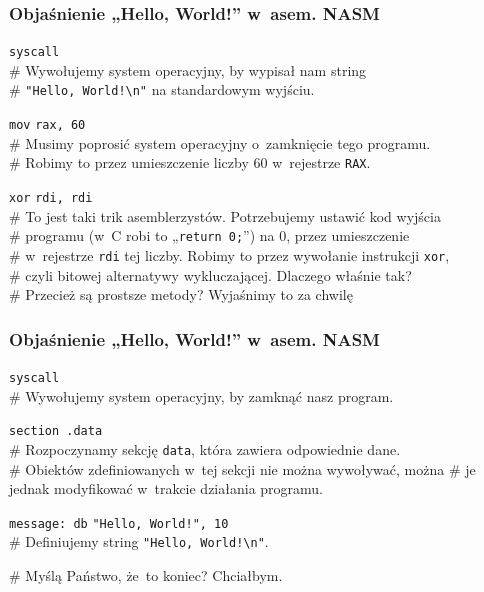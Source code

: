 \documentclass[10pt,t]{beamer}
\begin{document}
\begin{frame}
  \frametitle{Objaśnienie „Hello, World!” w~asem. NASM
    \parencite{Toal-NASM-Tutorial-Ver-2024}}


  \hphantom{aaaaaaaaa} \texttt{syscall} \\
  \# Wywołujemy system operacyjny, by wypisał nam string \\
  \# \texttt{"Hello, World!\textbackslash n"} na standardowym
  wyjściu.

  \hphantom{aaaaaaaaa} \texttt{mov} \hphantom{aaaaaa} \texttt{rax, 60} \\
  \# Musimy poprosić system operacyjny o~zamknięcie tego programu. \\
  \# Robimy to przez umieszczenie liczby $60$ w~rejestrze \texttt{RAX}.

  \hphantom{aaaaaaaaa} \texttt{xor} \hphantom{aaaaaa} \texttt{rdi, rdi} \\
  \# To jest taki trik asemblerzystów. Potrzebujemy ustawić kod wyjścia \\
  \# programu (w~C robi to „\texttt{return 0;}”) na $0$, przez
  umieszczenie \\
  \# w~rejestrze \texttt{rdi} tej liczby. Robimy to przez wywołanie
  instrukcji \texttt{xor}, \\
  \# czyli bitowej alternatywy wykluczającej. Dlaczego właśnie tak? \\
  \# Przecież są prostsze metody? Wyjaśnimy to za chwilę

\end{frame}





\begin{frame}
  \frametitle{Objaśnienie „Hello, World!” w~asem. NASM
    \parencite{Toal-NASM-Tutorial-Ver-2024}}


  \hphantom{aaaaaaaaa} \texttt{syscall} \\
  \# Wywołujemy system operacyjny, by zamknąć nasz program.

  \hphantom{aaaaaaaaa} \texttt{section .data} \\
  \# Rozpoczynamy sekcję \texttt{data}, która zawiera odpowiednie
  dane. \\
  \# Obiektów zdefiniowanych w~tej sekcji nie można wywoływać, można
  \# je jednak modyfikować w~trakcie działania programu.

  \texttt{message: db} \hphantom{aaaaa} \texttt{"Hello, World!", 10} \\
  \# Definiujemy string \texttt{"Hello, World!\textbackslash n"}.

  \# Myślą Państwo, że~to koniec? Chciałbym.

\end{frame}
\end{document}

